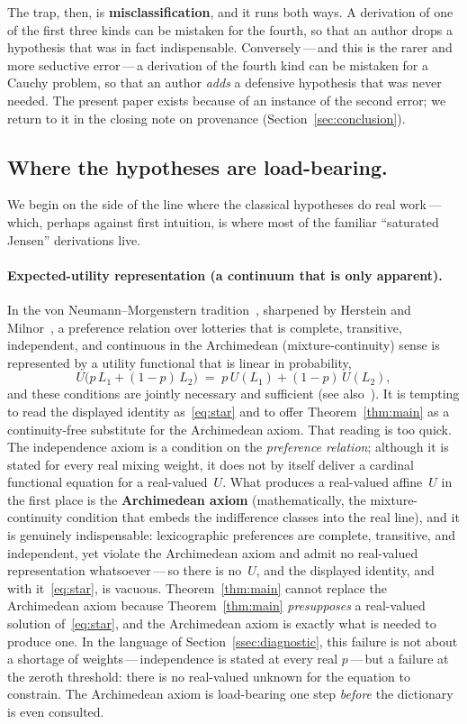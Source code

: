 \documentclass{article}
\theoremstyle{plain}
\theoremstyle{definition}
\begin{document}
The trap, then, is \textbf{misclassification}, and it runs both ways. A derivation of one of the first three kinds can be
mistaken for the fourth, so that an author drops a hypothesis that was
in fact indispensable. Conversely\,---\,and this is the rarer and more
seductive error\,---\,a derivation of the fourth kind can be mistaken
for a Cauchy problem, so that an author \emph{adds} a defensive
hypothesis that was never needed. The present paper exists because of
an instance of the second error; we return to it in the closing note
on provenance (Section~\ref{sec:conclusion}).

\subsection{Where the hypotheses are load-bearing.}
\label{ssec:load-bearing}

We begin on the side of the line where the classical hypotheses do real work\,---\,which, perhaps against first intuition, is where most
of the familiar ``saturated Jensen'' derivations live.

\paragraph{Expected-utility representation (a continuum that is only apparent).}
In the von Neumann--Morgenstern tradition~\cite{vNM1944}, sharpened by
Herstein and Milnor~\cite{HersteinMilnor1953}, a preference relation
over lotteries that is complete, transitive, independent, and
continuous in the Archimedean (mixture-continuity) sense is represented
by a utility functional that is linear in probability,
\[
U\bigl(p\,L_1+(1-p)\,L_2\bigr)\;=\;p\,U(L_1)+(1-p)\,U(L_2),
\]
and these conditions are jointly necessary and sufficient (see
also~\cite{Fishburn1970, Kreps1988}). It is tempting to read the
displayed identity as~\eqref{eq:star} and to offer
Theorem~\ref{thm:main} as a continuity-free substitute for the
Archimedean axiom. That reading is too quick. The
independence axiom is a condition on the \emph{preference relation};
although it is stated for every real mixing weight, it does not by
itself deliver a cardinal functional equation for a real-valued~$U$.
What produces a real-valued affine~$U$ in the first place is the
\textbf{Archimedean axiom} (mathematically, the mixture-continuity
condition that embeds the indifference classes into the real line), and
it is genuinely indispensable:
lexicographic preferences are complete, transitive, and independent,
yet violate the Archimedean axiom and admit no real-valued
representation whatsoever\,---\,so there is no~$U$, and the displayed
identity, and with it~\eqref{eq:star}, is vacuous.
Theorem~\ref{thm:main} cannot replace the Archimedean axiom because
Theorem~\ref{thm:main} \emph{presupposes} a real-valued solution
of~\eqref{eq:star}, and the Archimedean axiom is exactly what is
needed to produce one. In the language of
Section~\ref{ssec:diagnostic}, this failure is not about a shortage of weights\,---\,independence is stated at every real $p$\,---\,but a
failure at the zeroth threshold: there is no real-valued unknown for the
equation to constrain. The Archimedean axiom is load-bearing one step
\emph{before} the dictionary is even consulted.
\end{document}
